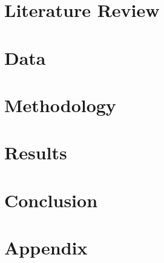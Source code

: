 \documentclass[a4paper,11pt]{article}
\begin{document}
\section{Literature Review}\label{sec:LitRev}


\section{Data}\label{sec:data}


\section{Methodology}\label{sec:methodology}


\section{Results}\label{sec:results}


\section{Conclusion}\label{sec:conclusion}


\newpage



\newpage

\section*{Appendix}
\appendix
{}

\end{document}

